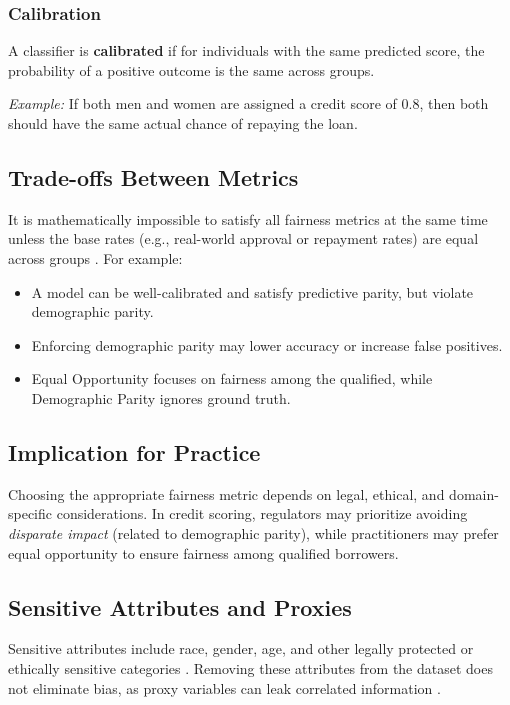 \subsubsection{Calibration}

A classifier is \textbf{calibrated} if for individuals with the same predicted score, the probability of a positive outcome is the same across groups.

\textit{Example:} If both men and women are assigned a credit score of 0.8, then both should have the same actual chance of repaying the loan.

\subsection*{Trade-offs Between Metrics}

It is mathematically impossible to satisfy all fairness metrics at the same time unless the base rates (e.g., real-world approval or repayment rates) are equal across groups \cite{hardt2016equality}. For example:

\begin{itemize}
    \item A model can be well-calibrated and satisfy predictive parity, but violate demographic parity.
    \item Enforcing demographic parity may lower accuracy or increase false positives.
    \item Equal Opportunity focuses on fairness among the qualified, while Demographic Parity ignores ground truth.
\end{itemize}

\subsection*{Implication for Practice}

Choosing the appropriate fairness metric depends on legal, ethical, and domain-specific considerations. In credit scoring, regulators may prioritize avoiding \textit{disparate impact} (related to demographic parity), while practitioners may prefer equal opportunity to ensure fairness among qualified borrowers.


\subsection{Sensitive Attributes and Proxies}

Sensitive attributes include race, gender, age, and other legally protected or ethically sensitive categories \cite{barocas2016big}. Removing these attributes from the dataset does not eliminate bias, as proxy variables can leak correlated information \cite{mehrabi2021survey}.

